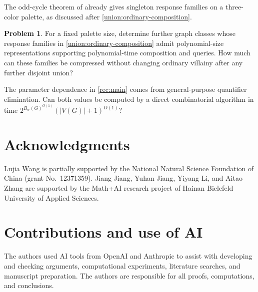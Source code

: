 \documentclass[11pt,reqno]{amsart}
\numberwithin{equation}{section}
\theoremstyle{definition}
\newtheorem{problem}[theorem]{Problem}
\theoremstyle{remark}
\begin{document}
The odd-cycle theorem of \cite[Theorem~3.15]{jiang2026exact} already
gives singleton response families on a three-color palette, as discussed
after \cref{union:ordinary-composition}.
\begin{problem}\label{problem:response-compression}
For a fixed palette size, determine further graph classes whose response
families in \cref{union:ordinary-composition} admit polynomial-size
representations supporting polynomial-time composition and queries.
How much can these families be compressed without changing ordinary
villainy after any further disjoint union?
\end{problem}

The parameter dependence in \cref{rec:main} comes from general-purpose
quantifier elimination. Can both values be computed by a direct
combinatorial algorithm in time
$2^{B_{\mathrm w}(G)^{O(1)}}(|V(G)|+1)^{O(1)}$?

\section*{Acknowledgments}

Lujia Wang is partially supported by the National Natural Science
Foundation of China (grant No.~12371359). Jiang Jiang, Yuhan Jiang,
Yiyang Li, and Aitao Zhang are
supported by the Math+AI research project of Hainan Bielefeld University
of Applied Sciences.

\section*{Contributions and use of AI}

The authors used AI tools from OpenAI and Anthropic to assist with developing and
checking arguments, computational experiments, literature searches,
and manuscript preparation.
The authors are responsible for all proofs, computations, and conclusions.
\end{document}
